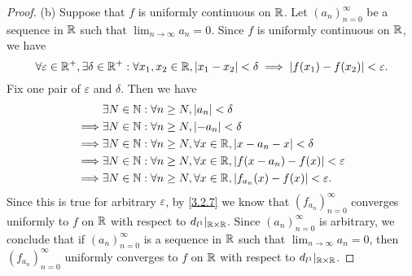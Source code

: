 \begin{proof}{(b)}
  Suppose that \(f\) is uniformly continuous on \(\mathbb{R}\).
  Let \((a_n)_{n = 0}^\infty\) be a sequence in \(\mathbb{R}\) such that \(\lim_{n \to \infty} a_n = 0\).
  Since \(f\) is uniformly continuous on \(\mathbb{R}\), we have
  \[
    \forall \varepsilon \in \mathbb{R}^+, \exists \delta \in \mathbb{R}^+ : \forall x_1, x_2 \in \mathbb{R}, \left\lvert x_1 - x_2\right\rvert < \delta \implies \left\lvert f(x_1) - f(x_2)\right\rvert < \varepsilon.
  \]
  Fix one pair of \(\varepsilon\) and \(\delta\).
  Then we have
  \begin{align*}
             & \exists N \in \mathbb{N} : \forall n \geq N, \left\lvert a_n\right\rvert < \delta                                       \\
    \implies & \exists N \in \mathbb{N} : \forall n \geq N, \left\lvert-a_n\right\rvert < \delta                                      \\
    \implies & \exists N \in \mathbb{N} : \forall n \geq N, \forall x \in \mathbb{R}, \left\lvert x - a_n - x\right\rvert < \delta             \\
    \implies & \exists N \in \mathbb{N} : \forall n \geq N, \forall x \in \mathbb{R}, \left\lvert f(x - a_n) - f(x)\right\rvert < \varepsilon  \\
    \implies & \exists N \in \mathbb{N} : \forall n \geq N, \forall x \in \mathbb{R}, \left\lvert f_{a_n}(x) - f(x)\right\rvert < \varepsilon.
  \end{align*}
  Since this is true for arbitrary \(\varepsilon\), by \cref{3.2.7} we know that \((f_{a_n})_{n = 0}^\infty\) converges uniformly to \(f\) on \(\mathbb{R}\) with respect to \(d_{l^1}|_{\mathbb{R} \times \mathbb{R}}\).
  Since \((a_n)_{n = 0}^\infty\) is arbitrary, we conclude that if \((a_n)_{n = 0}^\infty\) is a sequence in \(\mathbb{R}\) such that \(\lim_{n \to \infty} a_n = 0\), then \((f_{a_n})_{n = 0}^\infty\) uniformly converges to \(f\) on \(\mathbb{R}\) with respect to \(d_{l^1}|_{\mathbb{R} \times \mathbb{R}}\).


\end{proof}
